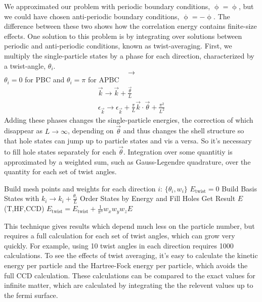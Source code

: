We approximated our problem with periodic boundary conditions, $\mathop{\phi(x_{i})}=\mathop{\phi(x_{i}+L)}$, but we could have chosen anti-periodic boundary conditions, $\mathop{\phi(x_{i})}=-\mathop{\phi(x_{i}+L)}$. The difference between these two shows how the correlation energy contains finite-size effects. One solution to this problem is by integrating over solutions between periodic and anti-periodic conditions, known as twist-averaging. First, we multiply the single-particle states by a phase for each direction, characterized by a twist-angle, $\theta_{i}$.
\begin{equation}
  \mathop{\phi_{\vec{k}}(\vec{x}+\vec{L})}\rightarrow\mathop{e^{i\vec{\theta}}\phi_{\vec{k}}(\vec{x})}
\end{equation}
$\theta_{i}=0$ for PBC and $\theta_{i}=\pi$ for APBC
\begin{align}
\vec{k}\rightarrow\vec{k}+\frac{\vec{\theta}}{L} \\
\epsilon_{\vec{k}}\rightarrow\epsilon_{\vec{k}}+\frac{\pi}{L}\vec{k}\cdot\vec{\theta}+\frac{\pi^{2}}{L^{2}}
\end{align}
Adding these phases changes the single-particle energies, the correction of which disappear as $L\rightarrow\infty$, depending on $\vec{\theta}$ and thus changes the shell structure so that hole states can jump up to particle states and vis a versa. So it's necessary to fill hole states separately for each $\vec{\theta}$. Integration over some quantitiy is approximated by a weighted sum, such as Gauss-Legendre quadrature, over the quantity for each set of twist angles.

\begin{algorithmic}
  \State Build mesh points and weights for each direction $i$: $\{\theta_{i},w_{i}\}$
  \State $E_{\text{twist}}=0$
  \State Build Basis States with $k_{i}\rightarrow k_{i}+\frac{\theta_{i}}{L}$
  \State Order States by Energy and Fill Holes
  \State Get Result $E$ (T,HF,CCD)
  \State $E_{\text{twist}}=E_{\text{twist}}+\frac{1}{\pi^{3}}w_{x}w_{y}w_{z}E$
  \EndFor
  \EndFor
  \EndFor
\end{algorithmic}

This technique gives results which depend much less on the particle number, but requires a full calculation for each set of twist angles, which can grow very quickly. For example, using 10 twist angles in each direction requires 1000 calculations. To see the effects of twist averaging, it's easy to calculate the kinetic energy per particle and the Hartree-Fock energy per particle, which avoids the full CCD calculation. These calculations can be compared to the exact values for infinite matter, which are calculated by integrating the the relevent values up to the fermi surface.

